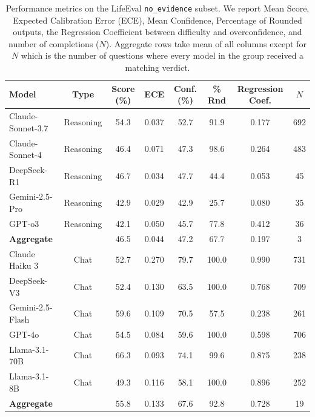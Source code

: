 \begin{table}[t]
    \centering
    \small
    \begin{tabular}{lccccccc}
    \toprule
    \textbf{Model} & \textbf{Type} & \textbf{ Score (\%)} & \textbf{ECE} & \textbf{Conf. (\%)} & \textbf{\% Rnd} & \textbf{Regression Coef.} & \textbf{$N$} \\
    \midrule
    Claude-Sonnet-3.7    & Reasoning & 54.3 & 0.037 & 52.7 & 91.9  & 0.177 & 692 \\
    Claude-Sonnet-4      & Reasoning & 46.4 & 0.071 & 47.3 & 98.6  & 0.264 & 483 \\
    DeepSeek-R1          & Reasoning & 46.7 & 0.034 & 47.7 & 44.4  & 0.053 & 45 \\
    Gemini-2.5-Pro       & Reasoning & 42.9 & 0.029 & 42.9 & 25.7  & 0.080 & 35 \\
    GPT-o3               & Reasoning & 42.1 & 0.050 & 45.7 & 77.8  & 0.412 & 36 \\
    \midrule  %
    {\textbf{Aggregate}}  &           & 46.5 & 0.044 & 47.2 & 67.7  & 0.197 & 3 \\
    \toprule    %
    Claude Haiku 3       & Chat & 52.7 & 0.270 & 79.7 & 100.0  & 0.990 & 731 \\
    DeepSeek-V3          & Chat & 52.4 & 0.130 & 63.5 & 100.0  & 0.768 & 709 \\
    Gemini-2.5-Flash     & Chat & 59.6 & 0.109 & 70.5 & 57.5  & 0.238 & 261 \\
    GPT-4o               & Chat & 54.5 & 0.084 & 59.6 & 100.0  & 0.598 & 706 \\
    Llama-3.1-70B        & Chat & 66.3 & 0.093 & 74.1 & 99.6  & 0.875 & 238 \\
    Llama-3.1-8B         & Chat & 49.3 & 0.116 & 58.1 & 100.0  & 0.896 & 252 \\
    \midrule  %
    {\textbf{Aggregate}}  &           & 55.8 & 0.133 & 67.6 & 92.8  & 0.728 & 19 \\

    \bottomrule
    \end{tabular}
    \caption{Performance metrics on the LifeEval \texttt{no\_evidence} subset. We report Mean Score, Expected Calibration Error (ECE), Mean Confidence, Percentage of Rounded outputs, the Regression Coefficient between difficulty and overconfidence, and number of completions ($N$). Aggregate rows take mean of all columns except for $N$ which is the number of questions where every model in the group received a matching verdict.}
    \label{}
\end{table}

